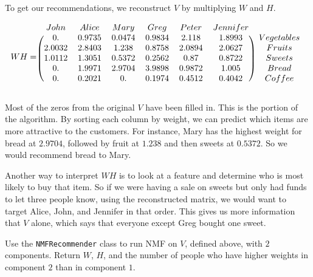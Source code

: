To get our recommendations, we reconstruct $V$ by multiplying $W$ and $H$.

\[
WH = 
\begin{blockarray}{ccccccc}
  John&  Alice  &Mary & Greg & Peter & Jennifer\\
  \begin{block}{(cccccc)c} 	
  0. &  0.9735 & 0.0474 & 0.9834 & 2.118 &   1.8993 &Vegetables\\
      2.0032 & 2.8403 & 1.238 & 0.8758 &  2.0894  &  2.0627 &Fruits\\
      1.0112 & 1.3051 &  0.5372 &  0.2562 &  0.87  &  0.8722 &Sweets\\
       0. & 1.9971 & 2.9704 & 3.9898 & 0.9872 &   1.005 &Bread\\
     0. & 0.2021 & 0. &  0.1974 & 0.4512  &  0.4042 &Coffee\\
   \end{block}
   \end{blockarray}
\]

Most of the zeros from the original $V$ have been filled in.
This is the  portion of the algorithm.
By sorting each column by weight, we can predict which items are more attractive to the customers.
For instance, Mary has the highest weight for bread at $2.9704$, followed by fruit at $1.238$ and then sweets at $0.5372$.
So we would recommend bread to Mary.

Another way to interpret $WH$ is to look at a feature and determine who is most likely to buy that item.
So if we were having a sale on sweets but only had funds to let three people know, using the reconstructed matrix, we would want to target Alice, John, and Jennifer in that order.
This gives us more information that $V$ alone, which says that everyone except Greg bought one sweet.

\begin{problem}
Use the \texttt{NMFRecommender}  class to run NMF on $V$, defined above, with $2$ components.
Return $W$, $H$, and the number of people who have higher weights in component $2$ than in component $1$.
\end{problem}

